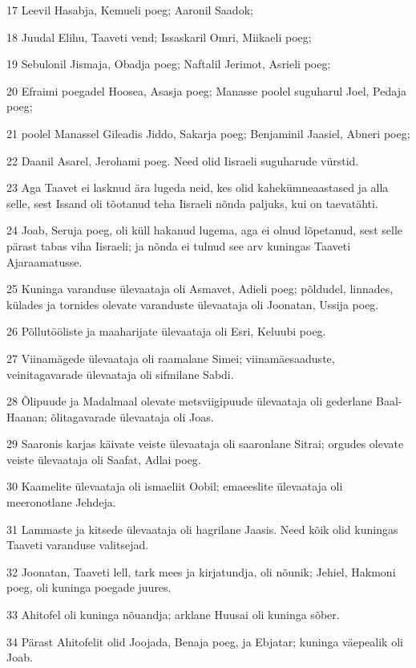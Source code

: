\par 17 Leevil Hasabja, Kemueli poeg; Aaronil Saadok;
\par 18 Juudal Elihu, Taaveti vend; Issaskaril Omri, Miikaeli poeg;
\par 19 Sebulonil Jismaja, Obadja poeg; Naftalil Jerimot, Asrieli poeg;
\par 20 Efraimi poegadel Hoosea, Asasja poeg; Manasse poolel suguharul Joel, Pedaja poeg;
\par 21 poolel Manassel Gileadis Jiddo, Sakarja poeg; Benjaminil Jaasiel, Abneri poeg;
\par 22 Daanil Asarel, Jerohami poeg. Need olid Iisraeli suguharude vürstid.
\par 23 Aga Taavet ei lasknud ära lugeda neid, kes olid kahekümneaastased ja alla selle, sest Issand oli tõotanud teha Iisraeli nõnda paljuks, kui on taevatähti.
\par 24 Joab, Seruja poeg, oli küll hakanud lugema, aga ei olnud lõpetanud, sest selle pärast tabas viha Iisraeli; ja nõnda ei tulnud see arv kuningas Taaveti Ajaraamatusse.
\par 25 Kuninga varanduse ülevaataja oli Asmavet, Adieli poeg; põldudel, linnades, külades ja tornides olevate varanduste ülevaataja oli Joonatan, Ussija poeg.
\par 26 Põllutööliste ja maaharijate ülevaataja oli Esri, Keluubi poeg.
\par 27 Viinamägede ülevaataja oli raamalane Simei; viinamäesaaduste, veinitagavarade ülevaataja oli sifmilane Sabdi.
\par 28 Õlipuude ja Madalmaal olevate metsviigipuude ülevaataja oli gederlane Baal-Haanan; õlitagavarade ülevaataja oli Joas.
\par 29 Saaronis karjas käivate veiste ülevaataja oli saaronlane Sitrai; orgudes olevate veiste ülevaataja oli Saafat, Adlai poeg.
\par 30 Kaamelite ülevaataja oli ismaeliit Oobil; emaeeslite ülevaataja oli meeronotlane Jehdeja.
\par 31 Lammaste ja kitsede ülevaataja oli hagrilane Jaasis. Need kõik olid kuningas Taaveti varanduse valitsejad.
\par 32 Joonatan, Taaveti lell, tark mees ja kirjatundja, oli nõunik; Jehiel, Hakmoni poeg, oli kuninga poegade juures.
\par 33 Ahitofel oli kuninga nõuandja; arklane Huusai oli kuninga sõber.
\par 34 Pärast Ahitofelit olid Joojada, Benaja poeg, ja Ebjatar; kuninga väepealik oli Joab.

